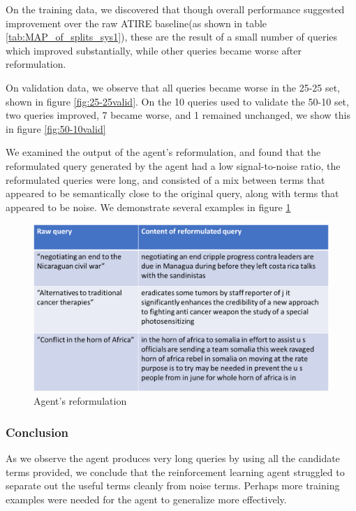 On the training data, we discovered that though overall performance suggested improvement over the raw ATIRE baseline(as shown in table \ref{tab:MAP_of_splits_sys1}), these are the result of a small number of queries which improved substantially, while other queries became worse after reformulation. 

On validation data, we observe that all queries became worse in the 25-25 set, shown in figure \ref{fig:25-25valid}. On the 10 queries used to validate the 50-10 set, two queries improved, 7 became worse, and 1 remained unchanged, we show this in figure \ref{fig:50-10valid}

We examined the output of the agent's reformulation, and found that the reformulated query generated by the agent had a low signal-to-noise ratio, the reformulated queries were long, and consisted of a mix between terms that appeared to be semantically close to the original query, along with terms that appeared to be noise.  We demonstrate several examples in figure \ref{fig:qualitative}

\begin{figure}[H]
	\centering
	\includegraphics[width=1\linewidth]{images/chapter_4/first_system/per_query_improvment/qualitative}
	\caption{Agent's reformulation}
	\label{fig:qualitative}
\end{figure}


\subsubsection{Conclusion}
As we observe the agent produces very long queries by using all the candidate terms provided, we conclude that the reinforcement learning agent struggled to separate out the useful terms cleanly from noise terms. Perhaps more training examples were needed for the agent to generalize more effectively. 



